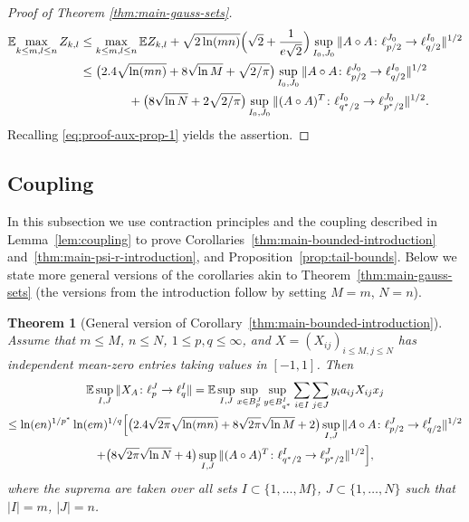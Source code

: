 \documentclass[a4paper]{amsart}
\newtheorem{theorem}{Theorem}[section]
\theoremstyle{definition}
\theoremstyle{remark}
\numberwithin{equation}{section}
\newcommand*{\EE}{\mathbb{E}}
\newcommand*{\hadprod}{\mathbin{\circ}} %
\begin{document}
\begin{proof}[Proof of Theorem \ref{thm:main-gauss-sets}]
\begin{align*}
\EE\! \max_{k\leq m, l\leq n} Z_{k,l} & \leq \max_{k\leq m, l\leq n}\EE Z_{k,l}  +  \sqrt{2\ln(mn)}\Bigl(\sqrt{2} +  \frac1{e\sqrt 2}\Bigr) \sup_{I_0, J_0} \|A\hadprod A \colon \ell^{J_0}_{p/2} \to \ell^{I_0}_{q/2}\|^{1/2}
\\ &\leq \bigl(2.4\sqrt{\ln(mn)} +8\sqrt{\ln M}   + \sqrt{2/\pi}\bigr)\sup_{I_0, J_0} \|A\hadprod A \colon \ell^{J_0}_{p/2} \to \ell^{I_0}_{q/2}\|^{1/2}
\nonumber\\
 &   \qquad \qquad+ \bigl(8\sqrt{\ln N} +2 \sqrt{2/\pi}\bigr) \sup_{I_0, J_0}  \|(A\hadprod A)^T \colon \ell^{I_0}_{q^*/2} \to \ell^{J_0}_{p^*/2}\|^{1/2}.
\end{align*}
	Recalling \eqref{eq:proof-aux-prop-1} yields the assertion.
\end{proof}

\subsection{Coupling}
\label{subsect:coupling}

In this subsection we use contraction principles and the coupling described in Lemma~\ref{lem:coupling} to prove Corollaries~\ref{thm:main-bounded-introduction} and~\ref{thm:main-psi-r-introduction}, and Proposition~\ref{prop:tail-bounds}.
Below we state  more general versions of the corollaries akin to Theorem~\ref{thm:main-gauss-sets}
(the versions from the introduction follow by setting $M=m$, $N=n$).

\begin{theorem}[General version of Corollary~\ref{thm:main-bounded-introduction}]
\label{thm:main-bounded}
	Assume that $m\le M$, $n\le N$, $1\leq p,q \leq \infty$, and $X=(X_{ij})_{i\leq M, j\leq N}$ has independent mean-zero entries taking values in $[-1,1]$.  Then
\begin{multline*}
\EE \sup_{I, J} \|X_A\colon \ell_p^{J} \to \ell_q^{I} \|
=\EE \sup_{I, J} \sup_{x\in B_p^ {J}} \sup_{y\in B_{q^*}^ {I}} \sum_{i\in I} \sum_{j\in J} y_i a_{ij}X_{ij}x_j \\
 \le  \ln(en)^{1/p^*}  \ln(em)^{1/q} \Bigl[ \bigl(2.4\sqrt{2\pi} \sqrt{\ln(mn)}+8\sqrt{2\pi}\sqrt{\ln M}+2\bigr) \sup_{I,J} \|A\hadprod A \colon \ell^ {J}_{p/2} \to \ell^{ I}_{q/2}\|^{1/2}\\
  +\bigl(8\sqrt{2\pi}\sqrt{\ln N} +4\bigr) \sup_{I,J} \|(A\hadprod A)^T \colon \ell^{ I}_{q^*/2} \to \ell^ {J}_{p^*/2}\|^{1/2} \Bigr],
 \end{multline*}
 where the suprema are taken over all sets $I\subset \{1,\ldots,M\}$, $J\subset \{1,\ldots,N\}$ such that $|I|=m$, $|J|=n$.
 \end{theorem}
\end{document}
